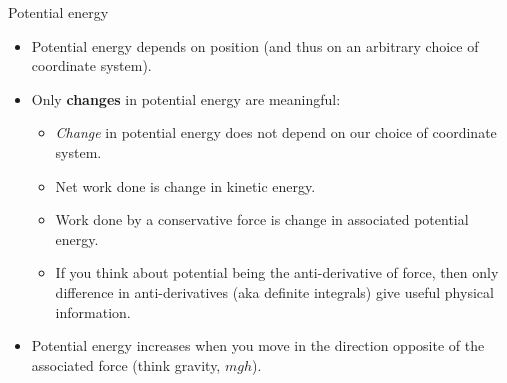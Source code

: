 \documentclass[aspectratio=169,
hyperref={colorlinks,urlcolor=blue}
]{beamer}
\begin{document}


\begin{frame}{Potential energy}
\begin{itemize}
\item Potential energy depends on position (and thus on an arbitrary choice of coordinate system).
\item Only \textbf{changes} in potential energy are meaningful:
\begin{itemize}
\item \textit{Change} in potential energy does not depend on our choice of coordinate system.
\item Net work done is change in kinetic energy.
\item Work done by a conservative force is change in associated potential energy.
\item If you think about potential being the anti-derivative of force, then only difference in anti-derivatives (aka definite integrals) give useful physical information.
\end{itemize}
\item Potential energy increases when you move in the direction opposite of the associated force (think gravity, $mgh$).
\end{itemize}
\end{frame}


\end{document}
